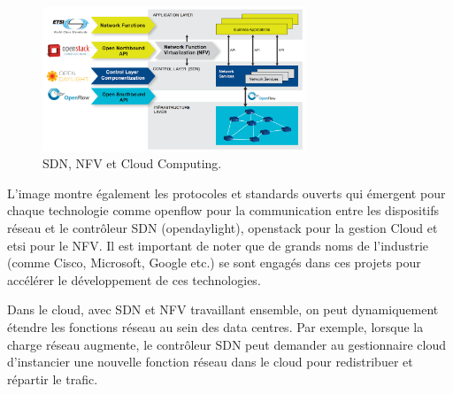 \begin{figure}[h]
\begin{center}
\includegraphics[width=0.7\textwidth]{images/cloud-sdn-nfv} 
\caption{SDN, NFV et Cloud Computing. \cite{OFSDNNFVand}} \label{cloud-sdn-nfv}
\end{center}
\end{figure} 

L'image montre également les protocoles et standards ouverts qui émergent pour chaque technologie comme \gls{openflow} pour la communication entre les dispositifs réseau et le contrôleur SDN (\gls{opendaylight}), \gls{openstack} pour la gestion Cloud et \gls{etsi} pour le NFV. Il est important de noter que de grands noms de l’industrie (comme Cisco, Microsoft, Google etc.) se sont engagés dans ces projets pour accélérer le développement de ces technologies.

Dans le cloud, avec SDN et NFV travaillant ensemble, on peut dynamiquement étendre les fonctions réseau au sein des data centres. Par exemple, lorsque la charge réseau augmente, le contrôleur SDN peut demander au gestionnaire cloud d'instancier une nouvelle fonction réseau dans le cloud pour redistribuer et répartir le trafic. 


